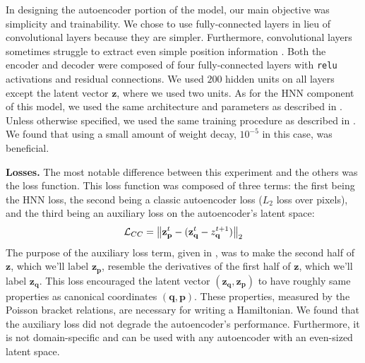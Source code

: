 \documentclass{article}
\begin{document}
In designing the autoencoder portion of the model, our main objective was simplicity and trainability. We chose to use fully-connected layers in lieu of convolutional layers because they are simpler. Furthermore, convolutional layers sometimes struggle to extract even simple position information \cite{Liu2018Intriguing}. Both the encoder and decoder were composed of four fully-connected layers with \texttt{relu} activations and residual connections. We used $200$ hidden units on all layers except the latent vector $\mathbf{z}$, where we used two units. As for the HNN component of this model, we used the same architecture and parameters as described in . Unless otherwise specified, we used the same training procedure as described in . We found that using a small amount of weight decay, $10^{-5}$ in this case, was beneficial.

\textbf{Losses.} The most notable difference between this experiment and the others was the loss function. This loss function was composed of three terms: the first being the HNN loss, the second being a classic autoencoder loss ($L_2$ loss over pixels), and the third being an auxiliary loss on the autoencoder's latent space:
\begin{equation}
\mathcal{L}_{CC} =  \big \Vert \mathbf{z}^{t}_{\mathbf{p}} - (\mathbf{z}^{t}_{\mathbf{q}}-z^{t+1}_{\mathbf{q}})  \big \Vert _2
\eqnlabel{eqn7}
\end{equation}
The purpose of the auxiliary loss term, given in , was to make the second half of $\mathbf{z}$, which we'll label $\mathbf{z}_{\mathbf{p}}$, resemble the derivatives of the first half of $\mathbf{z}$, which we'll label $\mathbf{z}_{\mathbf{q}}$. This loss encouraged the latent vector $(\mathbf{z}_{\mathbf{q}}, \mathbf{z}_{\mathbf{p}})$ to have roughly same properties as canonical coordinates $(\mathbf{q}, \mathbf{p})$. These properties, measured by the Poisson bracket relations, are necessary for writing a Hamiltonian. We found that the auxiliary loss did not degrade the autoencoder's performance. Furthermore, it is not domain-specific and can be used with any autoencoder with an even-sized latent space.
\end{document}

